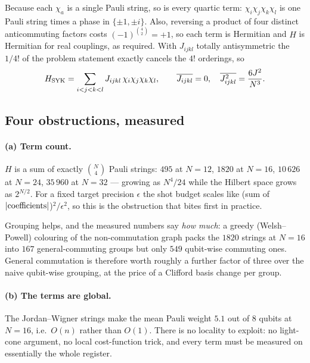 \documentclass[10pt,a4paper]{article}
\begin{document}
Because each $\chi_a$ is a single Pauli string, so is every quartic term:
$\chi_i\chi_j\chi_k\chi_l$ is one Pauli string times a phase in
$\{\pm1,\pm i\}$. Also, reversing a product of four distinct anticommuting
factors costs $(-1)^{\binom{4}{2}} = +1$, so each term is Hermitian and $H$
is Hermitian for real couplings, as required. With $J_{ijkl}$ totally
antisymmetric the $1/4!$ of the problem statement exactly cancels the $4!$
orderings, so
\begin{equation}
  H_{\rm SYK} = \sum_{i<j<k<l} J_{ijkl}\, \chi_i\chi_j\chi_k\chi_l ,
  \qquad
  \overline{J_{ijkl}} = 0,
  \quad \overline{J^2_{ijkl}} = \frac{6J^2}{N^3} .
\end{equation}

\subsection{Four obstructions, measured}

\begin{center}\small

\end{center}

\paragraph{(a) Term count.} $H$ is a sum of exactly $\binom{N}{4}$ Pauli
strings: $495$ at $N=12$, $1820$ at $N=16$, $10\,626$ at $N=24$,
$35\,960$ at $N=32$ --- growing as $N^4/24$ while the Hilbert space grows as
$2^{N/2}$. For a fixed target precision $\epsilon$ the shot budget scales like
(sum of $|{\rm coefficients}|$)$^2/\epsilon^2$, so this is the obstruction that
bites first in practice.

Grouping helps, and the measured numbers say \emph{how much}: a greedy
(Welsh--Powell) colouring of the non-commutation graph packs the $1820$ strings
at $N=16$ into $167$ general-commuting groups but only $549$ qubit-wise
commuting ones. General commutation is therefore worth roughly a further
factor of three over the naive qubit-wise grouping, at the price of a Clifford
basis change per group.

\paragraph{(b) The terms are global.} The Jordan--Wigner strings make the mean
Pauli weight $5.1$ out of $8$ qubits at $N=16$, i.e.\ $O(n)$ rather than
$O(1)$. There is no locality to exploit: no light-cone argument, no local
cost-function trick, and every term must be measured on essentially the whole
register.
\end{document}
